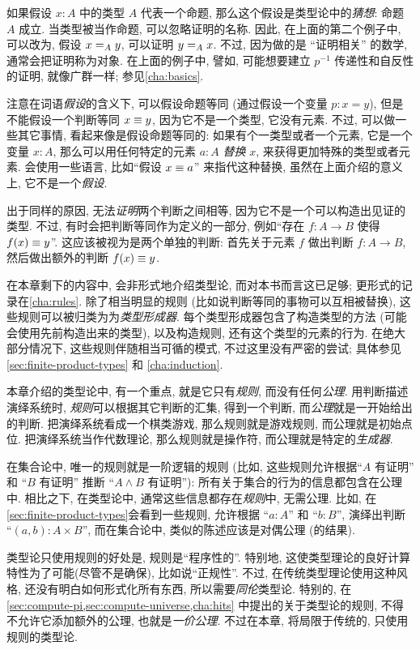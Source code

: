 如果假设 $x:A$ 中的类型 $A$ 代表一个命题, 那么这个假设是类型论中的\emph{猜想}:
%
命题 $A$ 成立.
当类型被当作命题, 可以忽略证明的名称.
因此, 在上面的第二个例子中, 可以改为, 假设 $\id[A]{x}{y}$, 可以证明 $\id[A]{y}{x}$.
不过, 因为做的是 ``证明相关'' 的数学,
%
通常会把证明称为对象.
在上面的例子中, 譬如, 可能想要建立 $p^{-1}$ 传递性和自反性的证明, 就像广群一样;
参见\cref{cha:basics}.

注意在词语\emph{假设}的含义下, 可以假设命题等同 (通过假设一个变量 $p:x=y$), 但是不能假设一个判断等同 $x\jdeq y$, 因为它不是一个类型, 它没有元素.
不过, 可以做一些其它事情, 看起来像是假设命题等同的: 如果有个一类型或者一个元素, 它是一个变量 $x:A$, 那么可以用任何特定的元素 $a:A$ \emph{替换} $x$, 来获得更加特殊的类型或者元素.
会使用一些语言, 比如``假设 $x\jdeq a$'' 来指代这种替换, 虽然在上面介绍的意义上, 它不是一个\emph{假设}.

出于同样的原因, 无法\emph{证明}两个判断之间相等, 因为它不是一个可以构造出见证的类型.
不过, 有时会把判断等同作为定义的一部分, 例如``存在 $f:A\to B$ 使得 $f(x)\jdeq y$''.
这应该被视为是两个单独的判断: 首先关于元素 $f$ 做出判断  $f:A\to B$, 然后做出额外的判断 $f(x)\jdeq y$.

在本章剩下的内容中, 会非形式地介绍类型论, 而对本书而言这已足够;
更形式的记录在\cref{cha:rules}.
除了相当明显的规则 (比如说判断等同的事物可以互相被替换), 这些规则可以被归类为为\emph{类型形成器}.
每个类型形成器包含了构造类型的方法 (可能会使用先前构造出来的类型), 以及构造规则, 还有这个类型的元素的行为.
在绝大部分情况下, 这些规则伴随相当可循的模式, 不过这里没有严密的尝试;
具体参见 \cref{sec:finite-product-types} 和 \cref{cha:induction}.
%

%
%
本章介绍的类型论中, 有一个重点, 就是它只有\emph{规则}, 而没有任何\emph{公理}.
用判断描述演绎系统时, \emph{规则}可以根据其它判断的汇集, 得到一个判断, 而\emph{公理}就是一开始给出的判断.
把演绎系统看成一个棋类游戏, 那么规则就是游戏规则, 而公理就是初始点位.
把演绎系统当作代数理论, 那么规则就是操作符, 而公理就是特定的\emph{生成器}.

在集合论中, 唯一的规则就是一阶逻辑的规则 (比如, 这些规则允许根据``$A$ 有证明'' 和 ``$B$ 有证明'' 推断 ``$A\wedge B$ 有证明''): 所有关于集合的行为的信息都包含在公理中.
相比之下, 在类型论中, 通常这些信息都存在\emph{规则}中, 无需公理.
比如, 在\cref{sec:finite-product-types}会看到一些规则, 允许根据 ``$a:A$'' 和 ``$b:B$'', 演绎出判断 ``$(a,b):A\times B$'', 而在集合论中, 类似的陈述应该是对偶公理 (的结果).

类型论只使用规则的好处是, 规则是``程序性的''.
特别地, 这使类型理论的良好计算特性为了可能(尽管不是确保), 比如说``正规性''.
%
不过, 在传统类型理论使用这种风格, 还没有明白如何形式化所有东西, 所以需要\emph{同伦}类型论.
特别的, 在\cref{sec:compute-pi,sec:compute-universe,cha:hits} 中提出的关于类型论的规则, 不得不允许它添加额外的公理, 也就是\emph{一价公理}.
不过在本章, 将局限于传统的, 只使用规则的类型论.